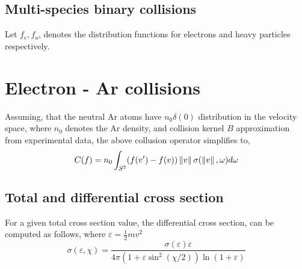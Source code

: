 \documentclass{article}[draft]
\begin{document}
\subsection{Multi-species binary collisions}
\label{sec:multispecies_collissions}
Let $f_e,f_o$, denotes the distribution functions for electrons and heavy particles respectively. 





\section{Electron - Ar collisions}
\label{sec:col_op_torch}

Assuming, that the neutral Ar atoms have $n_0\delta(0)$ distribution in the velocity space, where $n_0$ denotes the Ar density, and collision kernel $B$ approximation from experimental data, the above collusion operator simplifies to,
\begin{equation}
    C(f) = n_0 \int_{S^2} (f(v^\prime) - f(v)) \left\lVert v\right\rVert \sigma(\left\lVert v\right\rVert,\omega) d\omega
\end{equation}

\subsection{Total and differential cross section}
For a given total cross section value, the differential cross section, can be computed as follows\cite{vahedi1995monte}, where $\varepsilon= \frac{1}{2}mv^2$
\begin{equation}
    \sigma(\varepsilon,\chi) = \frac{\sigma(\varepsilon)\varepsilon}{4\pi (1 + \varepsilon \sin^2(\chi/2))\ln(1+\varepsilon)} 
\end{equation}
\end{document}
